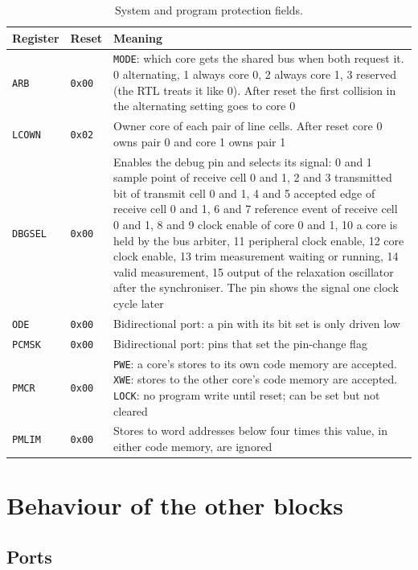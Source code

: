 \documentclass[10pt,a4paper]{article}
\newcommand{\reg}[1]{\texttt{#1}}
\begin{document}
\begin{table}[H]
\centering\small
\begin{tabularx}{\linewidth}{@{}llL@{}}
\toprule
Register & Reset & Meaning \\
\midrule
\reg{ARB} & \texttt{0x00} & \reg{MODE}: which core gets the shared bus when both request it. 0 alternating, 1 always core 0, 2 always core 1, 3 reserved (the RTL treats it like 0). After reset the first collision in the alternating setting goes to core 0 \\
\reg{LCOWN} & \texttt{0x02} & Owner core of each pair of line cells. After reset core 0 owns pair 0 and core 1 owns pair 1 \\
\reg{DBGSEL} & \texttt{0x00} & Enables the debug pin and selects its signal: 0 and 1 sample point of receive cell 0 and 1, 2 and 3 transmitted bit of transmit cell 0 and 1, 4 and 5 accepted edge of receive cell 0 and 1, 6 and 7 reference event of receive cell 0 and 1, 8 and 9 clock enable of core 0 and 1, 10 a core is held by the bus arbiter, 11 peripheral clock enable, 12 core clock enable, 13 trim measurement waiting or running, 14 valid measurement, 15 output of the relaxation oscillator after the synchroniser. The pin shows the signal one clock cycle later \\
\reg{ODE} & \texttt{0x00} & Bidirectional port: a pin with its bit set is only driven low \\
\reg{PCMSK} & \texttt{0x00} & Bidirectional port: pins that set the pin-change flag \\
\reg{PMCR} & \texttt{0x00} & \reg{PWE}: a core's stores to its own code memory are accepted. \reg{XWE}: stores to the other core's code memory are accepted. \reg{LOCK}: no program write until reset; can be set but not cleared \\
\reg{PMLIM} & \texttt{0x00} & Stores to word addresses below four times this value, in either code memory, are ignored \\
\bottomrule
\end{tabularx}
\caption{System and program protection fields.}
\end{table}

\section{Behaviour of the other blocks}\label{sec:perbeh}

\subsection{Ports}
\end{document}
